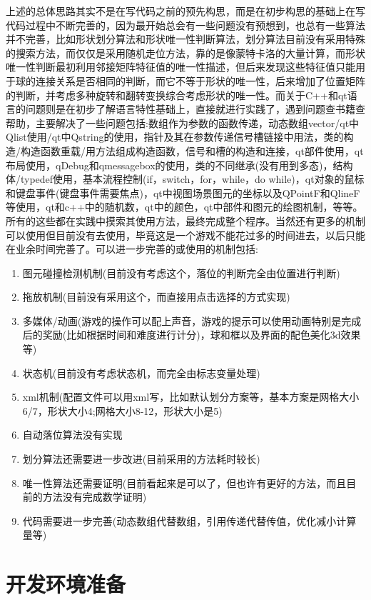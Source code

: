 \documentclass[11pt,twoside]{article} %
\begin{document}
上述的总体思路其实不是在写代码之前的预先构思，而是在初步构思的基础上在写代码过程中不断完善的，因为最开始总会有一些问题没有预想到，也总有一些算法并不完善，比如形状划分算法和形状唯一性判断算法，划分算法目前没有采用特殊的搜索方法，而仅仅是采用随机走位方法，靠的是像蒙特卡洛的大量计算，而形状唯一性判断最初利用邻接矩阵特征值的唯一性描述，但后来发现这些特征值只能用于球的连接关系是否相同的判断，而它不等于形状的唯一性，后来增加了位置矩阵的判断，并考虑多种旋转和翻转变换综合考虑形状的唯一性。而关于C++和qt语言的问题则是在初步了解语言特性基础上，直接就进行实践了，遇到问题查书籍查帮助，主要解决了一些问题包括:数组作为参数的函数传递，动态数组vector/qt中Qlist使用/qt中Qstring的使用，指针及其在参数传递信号槽链接中用法，类的构造/构造函数重载/用方法组成构造函数，信号和槽的构造和连接，qt部件使用，qt布局使用，qDebug和qmessagebox的使用，类的不同继承(没有用到多态)，结构体/typedef使用，基本流程控制(if，switch，for，while，do while)，qt对象的鼠标和键盘事件(键盘事件需要焦点)，qt中视图场景图元的坐标以及QPointF和QlineF等使用，qt和c++中的随机数，qt中的颜色，qt中部件和图元的绘图机制，等等。所有的这些都在实践中摸索其使用方法，最终完成整个程序。当然还有更多的机制可以使用但目前没有去使用，毕竟这是一个游戏不能花过多的时间进去，以后只能在业余时间完善了。可以进一步完善的或使用的机制包括:
\begin{enumerate}
  \item 图元碰撞检测机制(目前没有考虑这个，落位的判断完全由位置进行判断)
  \item 拖放机制(目前没有采用这个，而直接用点击选择的方式实现)
  \item 多媒体/动画(游戏的操作可以配上声音，游戏的提示可以使用动画特别是完成后的奖励(比如根据时间和难度进行计分)，球和框以及界面的配色美化3d效果等)
  \item 状态机(目前没有考虑状态机，而完全由标志变量处理)
  \item xml机制(配置文件可以用xml写，比如默认划分方案等，基本方案是网格大小6/7，形状大小4;网格大小8-12，形状大小是5)
  \item 自动落位算法没有实现
  \item 划分算法还需要进一步改进(目前采用的方法耗时较长)
  \item 唯一性算法还需要证明(目前看起来是可以了，但也许有更好的方法，而且目前的方法没有完成数学证明)
  \item 代码需要进一步完善(动态数组代替数组，引用传递代替传值，优化减小计算量等)
\end{enumerate}

\section{开发环境准备}
\end{document}
